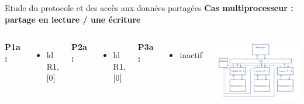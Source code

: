 \documentclass{beamer}
\begin{document}
\begin{frame}{Etude du protocole et des accès aux données partagées}
    \textbf{Cas multiprocesseur : partage en lecture / une écriture}
    \begin{columns}[c] %

        \textbf{P1a : }
        \begin{itemize}
            \item ld R1, [0]
        \end{itemize}

        \textbf{P2a : }
        \begin{itemize}
            \item ld R1, [0]
        \end{itemize}

        \textbf{P3a : }
        \begin{itemize}
            \item inactif
        \end{itemize}

        \vspace{1cm}
        \includegraphics[scale=0.3]{archi.png}
        
    \end{columns}
\end{frame}
\end{document}
